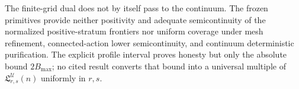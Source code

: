 The finite-grid dual does not by itself pass to the continuum.  The frozen primitives provide neither positivity and adequate semicontinuity of the normalized positive-stratum frontiers nor uniform coverage under mesh refinement, connected-action lower semicontinuity, and continuum deterministic purification.  The explicit profile interval proves honesty but only the absolute bound \(2B_{\max}\); no cited result converts that bound into a universal multiple of \(\mathfrak L_{r,s}^{\mathcal U}(n)\) uniformly in \(r,s\).